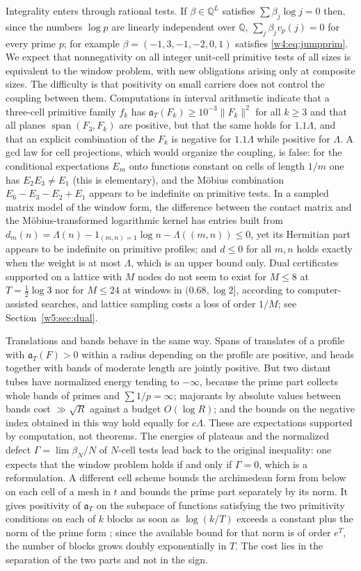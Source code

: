 \documentclass[11pt]{amsart}
\theoremstyle{definition}
\theoremstyle{remark}
\numberwithin{equation}{section}
\newcommand{\Q}{\mathbb{Q}}
\DeclareMathOperator{\spn}{span}
\newcommand{\aT}{\mathfrak{a}_T}                       %
\begin{document}
Integrality enters through rational tests. If $\beta\in\Q^L$ satisfies $\sum\beta_j\log j=0$ then, since the numbers
$\log p$ are linearly independent over $\Q$, $\sum_j\beta_jv_p(j)=0$ for every prime $p$; for example
$\beta=(-1,3,-1,-2,0,1)$ satisfies \eqref{w4:eq:jumpprim}. We expect that nonnegativity on all integer unit-cell primitive
tests of all sizes is equivalent to the window problem, with new obligations arising only at composite sizes. The
difficulty is that positivity on small carriers does not control the coupling between them. Computations in interval
arithmetic indicate that a three-cell primitive family $f_k$ has $\aT(F_k)\ge10^{-3}\|F_k\|^2$ for all $k\ge3$ and that
all planes $\spn(F_3,F_k)$ are positive, but that the same holds for $1.1\Lambda$, and that an explicit combination of
the $F_k$ is negative for $1.1\Lambda$ while positive for $\Lambda$. A gcd law for cell projections, which would
organize the coupling, is false: for the conditional expectations $E_m$ onto functions constant on cells of length
$1/m$ one has $E_2E_3\ne E_1$ (this is elementary), and the M\"obius combination $E_6-E_3-E_2+E_1$ appears to be
indefinite on primitive tests. In a sampled matrix model of the window form, the difference between the contact matrix
and the M\"obius-transformed logarithmic kernel has entries built from
$d_m(n)=\Lambda(n)-1_{(m,n)=1}\log n-\Lambda((m,n))\le0$, yet its Hermitian part appears to be indefinite on primitive
profiles; and $d\le0$ for all $m,n$ holds exactly when the weight is at most $\Lambda$, which is an upper bound only.
Dual certificates supported on a lattice with $M$ nodes do not seem to exist for $M\le8$ at $T=\frac12\log3$ nor for
$M\le24$ at windows in $(0.68,\log2]$, according to computer-assisted searches, and lattice sampling costs a loss of
order $1/M$; see Section~\ref{w5:sec:dual}.

Translations and bands behave in the same way. Spans of translates of a profile with $\aT(F)>0$ within a radius
depending on the profile are positive, and heads together with bands of moderate length are jointly positive. But two
distant tubes have normalized energy tending to $-\infty$, because the prime part collects whole bands of primes and
$\sum1/p=\infty$; majorants by absolute values between bands cost $\gg\sqrt R$ against a budget $O(\log R)$; and the
bounds on the negative index obtained in this way hold equally for $c\Lambda$. These are expectations supported by
computation, not theorems. The energies of plateaus and the normalized defect $\Gamma=\lim\beta_N/N$ of $N$-cell tests
lead back to the original inequality: one expects that the window problem holds if and only if $\Gamma=0$, which is a
reformulation. A different cell scheme bounds the archimedean form from below on each cell of a mesh in $t$ and bounds
the prime part separately by its norm. It gives positivity of $\aT$ on the subspace of functions satisfying the two
primitivity conditions on each of $k$ blocks as soon as $\log(k/T)$ exceeds a constant plus the norm of the prime form
\cite[Corollary~10.13]{P46}; since the available bound for that norm is of order $e^T$, the number of blocks grows
doubly exponentially in $T$. The cost lies in the separation of the two parts and not in the sign.
\end{document}
